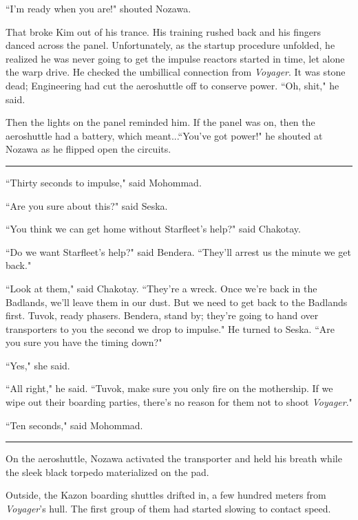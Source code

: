 \documentclass[twoside,letterpaper,12pt]{memoir}
\begin{document}
``I'm ready when you are!" shouted Nozawa.

That broke Kim out of his trance. His training rushed back and his fingers danced across the panel. Unfortunately, as the startup procedure unfolded, he realized he was never going to get the impulse reactors started in time, let alone the warp drive. He checked the umbillical connection from \textit{Voyager}. It was stone dead; Engineering had cut the aeroshuttle off to conserve power. ``Oh, shit," he said.

Then the lights on the panel reminded him. If the panel was on, then the aeroshuttle had a battery, which meant...``You've got power!" he shouted at Nozawa as he flipped open the circuits.

\begin{center}\rule{3cm}{0.4 pt}\end{center}

``Thirty seconds to impulse," said Mohommad.

``Are you sure about this?" said Seska.

``You think we can get home without Starfleet's help?" said Chakotay.

``Do we want Starfleet's help?" said Bendera. ``They'll arrest us the minute we get back."

``Look at them," said Chakotay. ``They're a wreck. Once we're back in the Badlands, we'll leave them in our dust. But we need to get back to the Badlands first. Tuvok, ready phasers. Bendera, stand by; they're going to hand over transporters to you the second we drop to impulse." He turned to Seska. ``Are you sure you have the timing down?"

``Yes," she said.

``All right," he said. ``Tuvok, make sure you only fire on the mothership. If we wipe out their boarding parties, there's no reason for them not to shoot \textit{Voyager}."

``Ten seconds," said Mohommad.

\begin{center}\rule{3cm}{0.4 pt}\end{center}

On the aeroshuttle, Nozawa activated the transporter and held his breath while the sleek black torpedo materialized on the pad.

Outside, the Kazon boarding shuttles drifted in, a few hundred meters from \textit{Voyager}'s hull. The first group of them had started slowing to contact speed.
\end{document}
